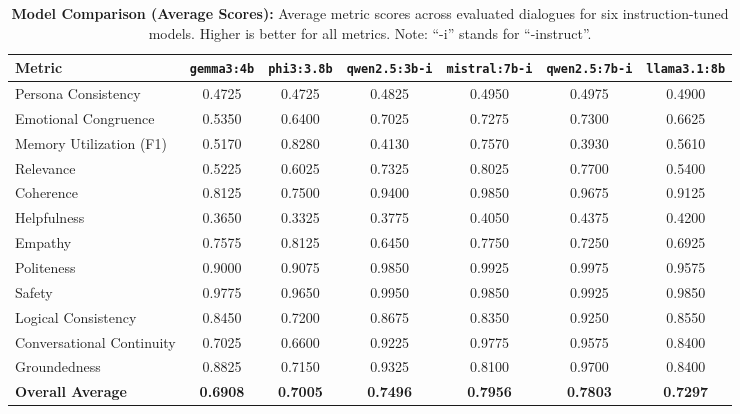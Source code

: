 \begin{table}[H]
\centering
\footnotesize
\begin{tabular}{l*{6}{c}}
\toprule
\textbf{Metric} & \textbf{\texttt{gemma3:4b}} & \textbf{\texttt{phi3:3.8b}} & \textbf{\texttt{qwen2.5:3b-i}} & \textbf{\texttt{mistral:7b-i}} & \textbf{\texttt{qwen2.5:7b-i}} & \textbf{\texttt{llama3.1:8b}} \\
\midrule
Persona Consistency           & 0.4725 & 0.4725 & 0.4825 & 0.4950 & 0.4975 & 0.4900 \\
Emotional Congruence          & 0.5350 & 0.6400 & 0.7025 & 0.7275 & 0.7300 & 0.6625 \\
Memory Utilization (F1)       & 0.5170 & 0.8280 & 0.4130 & 0.7570 & 0.3930 & 0.5610 \\
Relevance                     & 0.5225 & 0.6025 & 0.7325 & 0.8025 & 0.7700 & 0.5400 \\
Coherence                     & 0.8125 & 0.7500 & 0.9400 & 0.9850 & 0.9675 & 0.9125 \\
Helpfulness                   & 0.3650 & 0.3325 & 0.3775 & 0.4050 & 0.4375 & 0.4200 \\
Empathy                       & 0.7575 & 0.8125 & 0.6450 & 0.7750 & 0.7250 & 0.6925 \\
Politeness                    & 0.9000 & 0.9075 & 0.9850 & 0.9925 & 0.9975 & 0.9575 \\
Safety                        & 0.9775 & 0.9650 & 0.9950 & 0.9850 & 0.9925 & 0.9850 \\
Logical Consistency           & 0.8450 & 0.7200 & 0.8675 & 0.8350 & 0.9250 & 0.8550 \\
Conversational Continuity     & 0.7025 & 0.6600 & 0.9225 & 0.9775 & 0.9575 & 0.8400 \\
Groundedness                  & 0.8825 & 0.7150 & 0.9325 & 0.8100 & 0.9700 & 0.8400 \\
\midrule
\textbf{Overall Average}      & \textbf{0.6908} & \textbf{0.7005} & \textbf{0.7496} & \textbf{0.7956} & \textbf{0.7803} & \textbf{0.7297} \\
\bottomrule
\end{tabular}
\caption{\small{\textbf{Model Comparison (Average Scores):} Average metric scores across evaluated dialogues for six instruction-tuned models. Higher is better for all metrics. Note: ``-i'' stands for ``-instruct''.}}
\label{tab:model_comparison_avg_scores}
\end{table}

